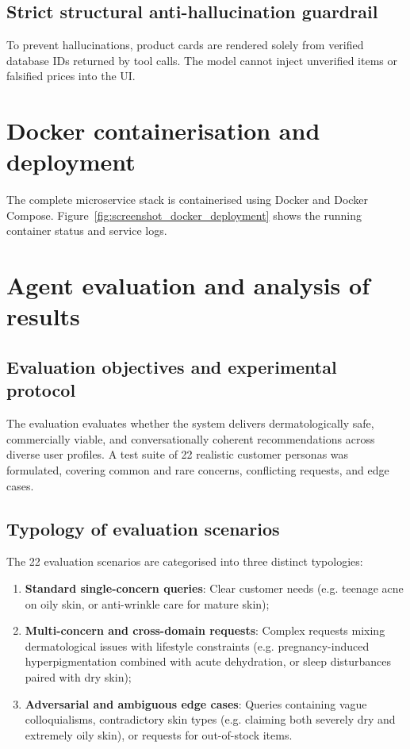 \subsection{Strict structural anti-hallucination guardrail}

To prevent hallucinations, product cards are rendered solely from verified database IDs returned by tool calls. The model cannot inject unverified items or falsified prices into the UI.

\section{Docker containerisation and deployment}

The complete microservice stack is containerised using Docker and Docker Compose. Figure~\ref{fig:screenshot_docker_deployment} shows the running container status and service logs.


\section{Agent evaluation and analysis of results}

\subsection{Evaluation objectives and experimental protocol}

The evaluation evaluates whether the system delivers dermatologically safe, commercially viable, and conversationally coherent recommendations across diverse user profiles. A test suite of 22 realistic customer personas was formulated, covering common and rare concerns, conflicting requests, and edge cases.

\subsection{Typology of evaluation scenarios}

The 22 evaluation scenarios are categorised into three distinct typologies:
\begin{enumerate}
  \item \textbf{Standard single-concern queries}: Clear customer needs (e.g. teenage acne on oily skin, or anti-wrinkle care for mature skin);
  \item \textbf{Multi-concern and cross-domain requests}: Complex requests mixing dermatological issues with lifestyle constraints (e.g. pregnancy-induced hyperpigmentation combined with acute dehydration, or sleep disturbances paired with dry skin);
  \item \textbf{Adversarial and ambiguous edge cases}: Queries containing vague colloquialisms, contradictory skin types (e.g. claiming both severely dry and extremely oily skin), or requests for out-of-stock items.
\end{enumerate}

